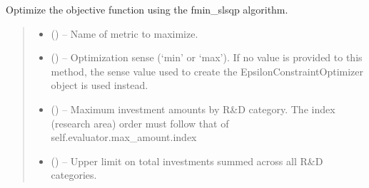 \documentclass[letterpaper,10pt,english]{sphinxmanual}
\begin{document}
\begin{fulllineitems}
\begin{fulllineitems}
\begin{quote}
\begin{description}
\begin{itemize}
\end{itemize}

\end{description}\end{quote}

\end{fulllineitems}


\begin{fulllineitems}
\label{\detokenize{tyche:tyche.EpsilonConstraints.EpsilonConstraintOptimizer.opt_slsqp}}
\pysigstartsignatures
{}
\pysigstopsignatures
\sphinxAtStartPar
Optimize the objective function using the fmin\_slsqp algorithm.
\begin{quote}\begin{description}
\begin{itemize}
\item {} 
\sphinxAtStartPar
{} () – Name of metric to maximize.

\item {} 
\sphinxAtStartPar
{} () – Optimization sense (‘min’ or ‘max’). If no value is provided to
this method, the sense value used to create the
EpsilonConstraintOptimizer object is used instead.

\item {} 
\sphinxAtStartPar
{} () – Maximum investment amounts by R\&D category. The index (research area)
order must follow that of self.evaluator.max\_amount.index

\item {} 
\sphinxAtStartPar
{} () – Upper limit on total investments summed across all R\&D categories.


\end{itemize}
\end{description}
\end{quote}
\end{fulllineitems}
\end{fulllineitems}
\end{document}
